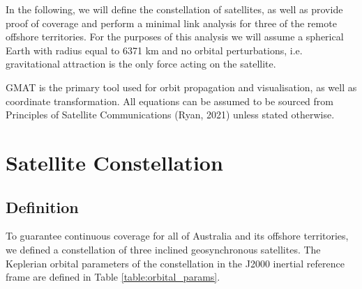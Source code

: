 \documentclass[12pt]{article}
\begin{document}
In the following, we will define the constellation of satellites, as well as provide proof of coverage and perform a minimal link analysis for three of the remote offshore territories. For the purposes of this analysis we will assume a spherical Earth with radius equal to 6371 km and no orbital perturbations, i.e. gravitational attraction is the only force acting on the satellite. 

GMAT is the primary tool used for orbit propagation and visualisation, as well as coordinate transformation. All equations can be assumed to be sourced from Principles of Satellite Communications (Ryan, 2021) unless stated otherwise.

\newpage
\section{Satellite Constellation}
\raggedright
\subsection{Definition}
To guarantee continuous coverage for all of Australia and its offshore territories, we defined a constellation of three inclined geosynchronous satellites. The Keplerian orbital parameters  of the constellation in the J2000 inertial reference frame are defined in Table \ref{table:orbital_params}.
\end{document}
